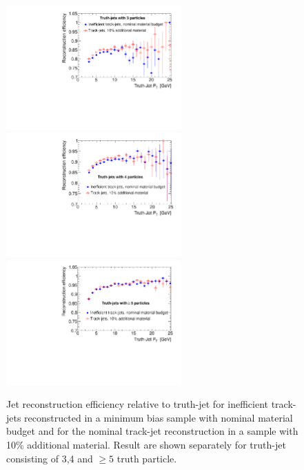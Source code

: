 \begin{figure}[tp]
\centering
\includegraphics[width=0.60\textwidth]{figure/trackjet/T7/inef_10cent_eff_3S.pdf}
\includegraphics[width=0.60\textwidth]{figure/trackjet/T7/inef_10cent_eff_4S.pdf}
\includegraphics[width=0.60\textwidth]{figure/trackjet/T7/inef_10cent_eff_5S.pdf}
\caption{Jet reconstruction efficiency relative to truth-jet for inefficient track-jets reconstructed in a minimum bias 
	sample with nominal material budget and for the nominal track-jet reconstruction in a sample with 10\% additional material.
	Result are shown separately for truth-jet consisting of 3,4 and $\geq 5$ truth particle.}

\label{fig:tj10tjex_eff}
\end{figure}    

